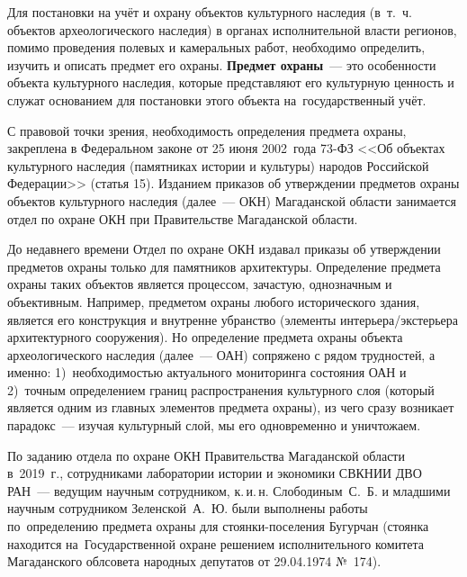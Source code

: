  

\makeProcTitle
{}

Для постановки на учёт и охрану объектов культурного наследия (в~т.~ч. объектов археологического наследия) в органах исполнительной власти регионов, помимо проведения полевых и камеральных работ, необходимо определить, изучить и описать предмет его охраны. \textbf{Предмет охраны}~--- это особенности объекта культурного наследия, которые представляют его культурную ценность и служат основанием для постановки этого объекта на~государственный учёт.

С правовой точки зрения, необходимость определения предмета охраны, закреплена в Федеральном законе от 25 июня 2002~года 73-ФЗ <<Об объектах культурного наследия (памятниках истории и культуры) народов Российской Федерации>> (статья 15). Изданием приказов об утверждении предметов охраны объектов культурного наследия (далее~--- ОКН) Магаданской области занимается отдел по охране ОКН при Правительстве Магаданской области.

До недавнего времени Отдел по охране ОКН издавал приказы об утверждении предметов охраны только для памятников архитектуры. Определение предмета охраны таких объектов является процессом, зачастую, однозначным и объективным. Например, предметом охраны любого исторического здания, является его конструкция и внутренне убранство (элементы интерьера/экстерьера архитектурного сооружения). Но определение предмета охраны объекта археологического наследия (далее~--- ОАН) сопряжено с рядом трудностей, а именно: 1)~необходимостью актуального мониторинга состояния ОАН и 2)~точным определением границ распространения культурного слоя (который является одним из главных элементов предмета охраны), из чего сразу возникает парадокс~--- изучая культурный слой, мы его одновременно и уничтожаем.

 По заданию отдела по охране ОКН Правительства Магаданской области в~2019~г., сотрудниками лаборатории истории и экономики СВКНИИ ДВО РАН~--- ведущим научным сотрудником, к.\,и.\,н. Слободиным~С.~Б. и младшими научным сотрудником Зеленской~А.~Ю. были выполнены работы по~определению предмета охраны для стоянки-поселения Бугурчан (стоянка находится на~Государственной охране решением исполнительного комитета Магаданского облсовета народных депутатов от 29.04.1974 №~174).

